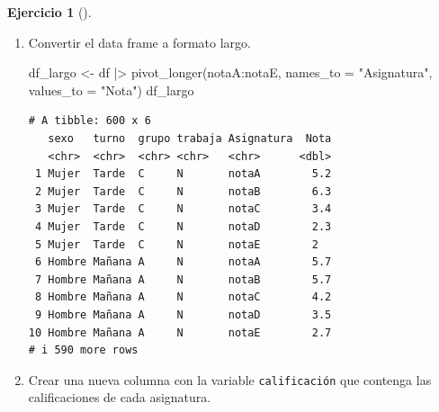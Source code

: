 \documentclass[
  a4paper,
]{scrreport}
\newenvironment{Shaded}{\begin{snugshade}}{\end{snugshade}}
\newcommand{\AttributeTok}[1]{\textcolor[rgb]{0.40,0.45,0.13}{#1}}
\newcommand{\FunctionTok}[1]{\textcolor[rgb]{0.28,0.35,0.67}{#1}}
\newcommand{\NormalTok}[1]{\textcolor[rgb]{0.00,0.23,0.31}{#1}}
\newcommand{\OtherTok}[1]{\textcolor[rgb]{0.00,0.23,0.31}{#1}}
\newcommand{\SpecialCharTok}[1]{\textcolor[rgb]{0.37,0.37,0.37}{#1}}
\newcommand{\StringTok}[1]{\textcolor[rgb]{0.13,0.47,0.30}{#1}}
\theoremstyle{definition}
\newtheorem{exercise}{Ejercicio}[chapter]
\theoremstyle{remark}
\begin{document}
\begin{exercise}[]
\begin{enumerate}
\begin{tcolorbox}
  \end{tcolorbox}
\item
  Convertir el data frame a formato largo.

  \begin{tcolorbox}[enhanced jigsaw, toprule=.15mm, rightrule=.15mm, arc=.35mm, colback=white, colbacktitle=quarto-callout-tip-color!10!white, toptitle=1mm, left=2mm, colframe=quarto-callout-tip-color-frame, opacityback=0, breakable, opacitybacktitle=0.6, bottomtitle=1mm, titlerule=0mm, title=\textcolor{quarto-callout-tip-color}{\faLightbulb}\hspace{0.5em}{Solución}, bottomrule=.15mm, coltitle=black, leftrule=.75mm]

\begin{Shaded}
\begin{Highlighting}[]
\NormalTok{df\_largo }\OtherTok{\textless{}{-}}\NormalTok{ df }\SpecialCharTok{|\textgreater{}} \FunctionTok{pivot\_longer}\NormalTok{(notaA}\SpecialCharTok{:}\NormalTok{notaE, }\AttributeTok{names\_to =} \StringTok{"Asignatura"}\NormalTok{, }\AttributeTok{values\_to =} \StringTok{"Nota"}\NormalTok{)}
\NormalTok{df\_largo}
\end{Highlighting}
\end{Shaded}

\begin{verbatim}
# A tibble: 600 x 6
   sexo   turno  grupo trabaja Asignatura  Nota
   <chr>  <chr>  <chr> <chr>   <chr>      <dbl>
 1 Mujer  Tarde  C     N       notaA        5.2
 2 Mujer  Tarde  C     N       notaB        6.3
 3 Mujer  Tarde  C     N       notaC        3.4
 4 Mujer  Tarde  C     N       notaD        2.3
 5 Mujer  Tarde  C     N       notaE        2  
 6 Hombre Mañana A     N       notaA        5.7
 7 Hombre Mañana A     N       notaB        5.7
 8 Hombre Mañana A     N       notaC        4.2
 9 Hombre Mañana A     N       notaD        3.5
10 Hombre Mañana A     N       notaE        2.7
# i 590 more rows
\end{verbatim}

  \end{tcolorbox}
\item
  Crear una nueva columna con la variable \texttt{calificación} que
  contenga las calificaciones de cada asignatura.

  \begin{tcolorbox}[enhanced jigsaw, toprule=.15mm, rightrule=.15mm, arc=.35mm, colback=white, colbacktitle=quarto-callout-tip-color!10!white, toptitle=1mm, left=2mm, colframe=quarto-callout-tip-color-frame, opacityback=0, breakable, opacitybacktitle=0.6, bottomtitle=1mm, titlerule=0mm, title=\textcolor{quarto-callout-tip-color}{\faLightbulb}\hspace{0.5em}{Solución}, bottomrule=.15mm, coltitle=black, leftrule=.75mm]


\end{tcolorbox}
\end{enumerate}
\end{exercise}
\end{document}
